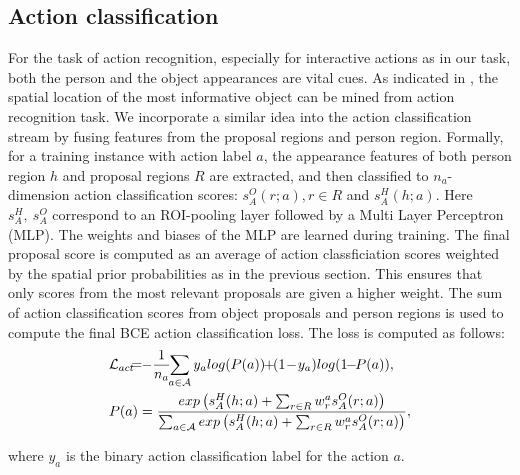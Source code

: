 \documentclass[10pt,twocolumn,letterpaper]{article}
\newcommand{\scr}[1]{{\mathcal #1}}
\begin{document}
\subsection{Action classification}
\vspace{-0.3\baselineskip}
For the task of action recognition, especially for interactive actions as in our task, both the person and the object appearances are vital cues. As indicated in \cite{gkioxari2015contextual}, the spatial location of the most informative object can be mined from action recognition task. We incorporate a similar idea into the action classification stream by fusing features from the proposal regions and person region. Formally, for a training instance with action label $a$, the appearance features of both person region $h$ and proposal regions $R$ are extracted, and then classified to $n_a$-dimension action classification scores: $s_A^O(r;a), r \in R$ and $s_A^H(h;a)$. Here $s_A^H,~s_A^O$ correspond to an ROI-pooling layer followed by a Multi Layer Perceptron (MLP). The weights and biases of the MLP are learned during training. The final proposal score is computed as an average of action classficiation scores weighted by the spatial prior probabilities as in the previous section. This ensures that only scores from the most relevant proposals are given a higher weight. The sum of action classification scores from object proposals and person regions is used to compute the final BCE action classification loss. The loss is computed as follows:
\vspace{-0.3\baselineskip}
{\small
\begin{align}
\label{eqn:act_cls_loss}
\vspace{-1.3\baselineskip}
&\hua{L}_{act}\!\!\! =\!\! -\frac{1}{n_a}\!\!\sum_{a \in \scr{A}} y_a log(P(a))\!\!+\!\!(1\!-\!y_a) log(1\!\!-\!\!P(a)), \nonumber\\
&P(a) = \frac{exp\left(s_A^H(h;a)+\sum_{r \in R}  w_r^{a} s_A^O(r;a)\right)}{\sum_{a \in \scr{A}}exp\left(s_A^H(h;a)+\sum_{r\in R}  w_r^{a} s_A^O(r;a)\right)},
\vspace{-1.3\baselineskip}
\end{align}}
\vspace{-0.6\baselineskip}

\noindent where $y_a$ is the binary action classification label for the action $a$.


\vspace{-0.3\baselineskip}
\end{document}
